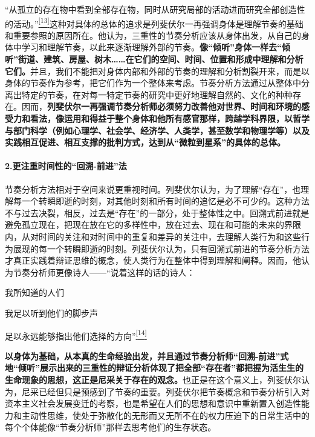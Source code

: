 \documentclass[UTF8, fontset = sourcesans, a4paper, oneside, zihao =
-4, scheme=chinese, no-math, space=true]{ctexbook}
\begin{document}
``从孤立的存在物中看到全部存在物，同时从研究局部的活动进而研究全部创造性的活动。''\protect\hypertarget{part0009_split_001.htmlux5cux23w13}{}{}\protect\hyperlink{part0009_split_004.htmlux5cux23m13}{\textsuperscript{{[}13{]}}}这种对具体的总体的追求是列斐伏尔一再强调身体是理解节奏的基础和重要参照的原因所在。他认为，三重性的节奏分析应该从身体出发，从自己的身体中学习和理解节奏，以此来逐渐理解外部的节奏。\textbf{像``倾听''身体一样去``倾听''街道、建筑、房屋、树木……在它们的空间、时间、位置和形成中理解和分析它们。}并且，我们不能把对身体内部和外部的节奏的理解和分析割裂开来，而是以身体的节奏作为参考，把它们作为一个整体来考虑。节奏分析方法通过从整体中分离出特定的节奏，在对每一特定节奏的研究中更好地理解自然的、文化的种种存在。因而，\textbf{列斐伏尔一再强调节奏分析师必须努力改善他对世界、时间和环境的感受力和看法，像运用和得益于整个身体和他所有感官那样，跨越学科界限，以哲学与部门科学（例如心理学、社会学、经济学、人类学，甚至数学和物理学等）以及实践相互促进、相互支撑的批判方式，达到从``微粒到星系''的具体的总体。}

\paragraph{\texorpdfstring{2.更注重时间性的``回溯-前进''法}{2.更注重时间性的回溯-前进法}}\label{part0009_split_001.htmlux5cux23e007}

节奏分析方法相对于空间来说更重视时间。列斐伏尔认为，为了理解``存在''，也理解每一个转瞬即逝的时刻，对其他时刻和所有时间的追忆是必不可少的。这种方法不与过去决裂，相反，过去是``存在''的一部分，处于整体性之中。回溯式前进就是避免孤立现在，把现在放在它的多样性中，放在过去、现在和可能的未来的界限内，从对时间的关注和对时间中的重复和差异的关注中，去理解人类行为和这些行为展现的每一个转瞬即逝的时刻。列斐伏尔认为，只有回溯式前进的节奏分析方法才真正实践着辩证思维的概念，使人类行为在整体中得到理解和阐释。因而，他认为节奏分析师更像诗人------``说着这样的话的诗人：

我所知道的人们

我足以听到他们的脚步声

足以永远能够指出他们选择的方向''\protect\hypertarget{part0009_split_001.htmlux5cux23w14}{}{}\protect\hyperlink{part0009_split_004.htmlux5cux23m14}{\textsuperscript{{[}14{]}}}

\textbf{以身体为基础，从本真的生命经验出发，并且通过节奏分析师``回溯-前进''式地``倾听''展示出来的三重性的辩证分析体现了把全部``存在者''都把握为活生生的生命现象的思想，这正是尼采关于存在的观念。}也正是在这个意义上，列斐伏尔认为，尼采已经但只是预感到了节奏的重要。列斐伏尔把节奏概念和节奏分析引入对资本主义社会发展变迁的考察，也是希望在人们的思想和意识中重新置入创造性能力和主动性思维，使处于弥散化的无形而又无所不在的权力压迫下的日常生活中的每个个体能像``节奏分析师''那样去思考他们的生存状态。
\end{document}
